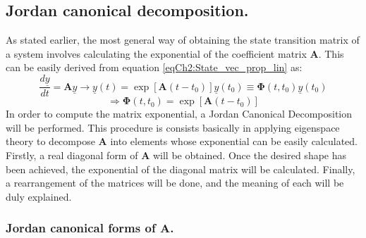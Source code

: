 	\subsection{Jordan canonical decomposition.}
	\indent As stated earlier, the most general way of obtaining the state transition matrix of a system involves calculating the exponential of the coefficient matrix $\bm A$. This can be easily derived from equation \eqref{eqCh2:State_vec_prop_lin} as:
	\[ 
	\dfrac{d\underline{y}}{dt} = \bm A \underline{y} \rightarrow \underline{y}(t) = \exp \left[ \bm A(t -t_0)\right] \underline{y}(t_0) \equiv \bm \Phi (t, t_0) \underline{y}(t_0) 
	\]
%	
	\begin{equation}
	\Rightarrow \bm \Phi (t, t_0) = \exp \left[ \bm A(t -t_0)\right]
	\end{equation}
	\indent In order to compute the matrix exponential, a Jordan Canonical Decomposition will be performed. This procedure is consists basically in applying eigenspace theory to decompose $\bm A$ into elements whose exponential can be easily calculated. Firstly, a real diagonal form of $\bm A$ will be obtained. Once the desired shape has been achieved, the exponential of the diagonal matrix will be calculated. Finally, a rearrangement of the matrices will be done, and the meaning of each will be duly explained.
		\subsubsection{Jordan canonical forms of $\bm A$.}
